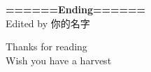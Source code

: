 \documentclass[11pt,fleqn, openany]{book} %
\begin{document}
\newpage
\begingroup
\thispagestyle{empty}
\centering
\vspace*{5cm}
\par\normalfont\fontsize{35}{35}\sffamily\selectfont
\textbf{======Ending======}\\
{\LARGE Edited by 你的名字}\par %
\vspace*{1cm}
{\Huge Thanks for reading\\ Wish you have a harvest}\par %
\endgroup
\end{document}

